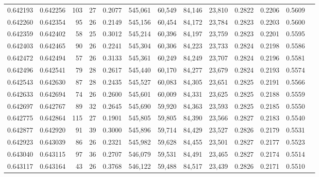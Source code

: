 \begin{tabular}{rrrrrrrrrrrrr}
0.642193 & 0.642256 & 103 &  27 &                                     0.2077 & 545,061 &  60,549 &  84,146 &  23,810 & 0.2822 & 0.2206 & 0.5609 \\
0.642260 & 0.642354 &  95 &  26 &                                     0.2149 & 545,156 &  60,454 &  84,172 &  23,784 & 0.2823 & 0.2203 & 0.5600 \\
0.642359 & 0.642402 &  58 &  25 &                                     0.3012 & 545,214 &  60,396 &  84,197 &  23,759 & 0.2823 & 0.2201 & 0.5595 \\
0.642403 & 0.642465 &  90 &  26 &                                     0.2241 & 545,304 &  60,306 &  84,223 &  23,733 & 0.2824 & 0.2198 & 0.5586 \\
0.642472 & 0.642494 &  57 &  26 &                                     0.3133 & 545,361 &  60,249 &  84,249 &  23,707 & 0.2824 & 0.2196 & 0.5581 \\
0.642496 & 0.642541 &  79 &  28 &                                     0.2617 & 545,440 &  60,170 &  84,277 &  23,679 & 0.2824 & 0.2193 & 0.5574 \\
0.642543 & 0.642630 &  87 &  28 &                                     0.2435 & 545,527 &  60,083 &  84,305 &  23,651 & 0.2825 & 0.2191 & 0.5566 \\
0.642633 & 0.642694 &  74 &  26 &                                     0.2600 & 545,601 &  60,009 &  84,331 &  23,625 & 0.2825 & 0.2188 & 0.5559 \\
0.642697 & 0.642767 &  89 &  32 &                                     0.2645 & 545,690 &  59,920 &  84,363 &  23,593 & 0.2825 & 0.2185 & 0.5550 \\
0.642775 & 0.642864 & 115 &  27 &                                     0.1901 & 545,805 &  59,805 &  84,390 &  23,566 & 0.2827 & 0.2183 & 0.5540 \\
0.642877 & 0.642920 &  91 &  39 &                                     0.3000 & 545,896 &  59,714 &  84,429 &  23,527 & 0.2826 & 0.2179 & 0.5531 \\
0.642923 & 0.643039 &  86 &  26 &                                     0.2321 & 545,982 &  59,628 &  84,455 &  23,501 & 0.2827 & 0.2177 & 0.5523 \\
0.643040 & 0.643115 &  97 &  36 &                                     0.2707 & 546,079 &  59,531 &  84,491 &  23,465 & 0.2827 & 0.2174 & 0.5514 \\
0.643117 & 0.643164 &  43 &  26 &                                     0.3768 & 546,122 &  59,488 &  84,517 &  23,439 & 0.2826 & 0.2171 & 0.5510 \\

\end{tabular}

